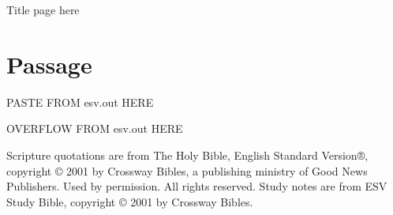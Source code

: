 \documentclass{bible-study-handout}
\begin{document}
Title page here

\newpage
\section{Passage}

PASTE FROM esv.out HERE

\newpage
OVERFLOW FROM esv.out HERE

\newpage
\begin{copyrightstatement}
Scripture quotations are from The Holy Bible, English Standard Version®, copyright © 2001 by Crossway Bibles, a publishing ministry of Good News Publishers. Used by permission. All rights reserved. Study notes are from ESV Study Bible, copyright © 2001 by Crossway Bibles.
\end{copyrightstatement}
\end{document}
